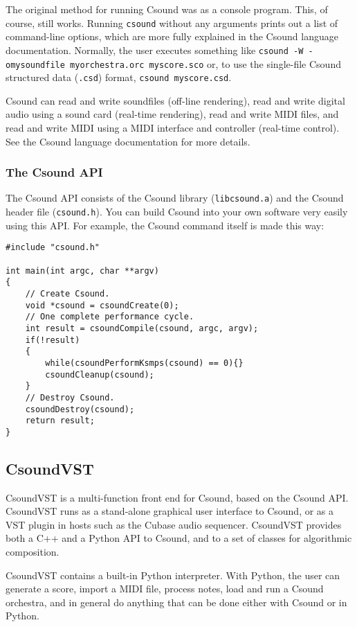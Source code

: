 \documentclass[10pt,letterpaper,onecolumn]{ltxguide}
\begin{document}
The original method for running Csound was as a console program. This, of course, still works. Running \texttt{csound} without any arguments prints out a list of command-line options, which are more fully explained in the Csound language documentation. Normally, the user executes something like \texttt{csound -W -omysoundfile myorchestra.orc myscore.sco} or, to use the single-file Csound structured data (\texttt{.csd}) format, \texttt{csound myscore.csd}.

Csound can read and write soundfiles (off-line rendering), read and write digital audio using a sound card (real-time rendering), read and write MIDI files, and read and write MIDI using a MIDI interface and controller (real-time control). See the Csound language documentation for more details. 

\subsubsection{The Csound API}

The Csound API consists of the Csound library (\texttt{libcsound.a}) and the Csound header file (\texttt{csound.h}). You can build Csound into your own software very easily using this API. For example, the Csound command itself is made this way:

\begin{lstlisting}
#include "csound.h"

int main(int argc, char **argv)
{
    // Create Csound.
    void *csound = csoundCreate(0);
    // One complete performance cycle.
    int result = csoundCompile(csound, argc, argv);
    if(!result)
    {
        while(csoundPerformKsmps(csound) == 0){}
        csoundCleanup(csound);
    }
    // Destroy Csound.
    csoundDestroy(csound);
    return result;
}
\end{lstlisting}

\subsection{CsoundVST}

CsoundVST is a multi-function front end for Csound, based on the Csound API. CsoundVST runs as a stand-alone graphical user interface to Csound, or as a VST plugin in hosts such as the Cubase audio sequencer. CsoundVST provides both a C++ and a Python API to Csound, and to a set of classes for algorithmic composition. 

CsoundVST contains a built-in Python interpreter. With Python, the user can generate a score, import a MIDI file, process notes, load and run a Csound orchestra, and in general do anything that can be done either with Csound or in Python.
\end{document}
